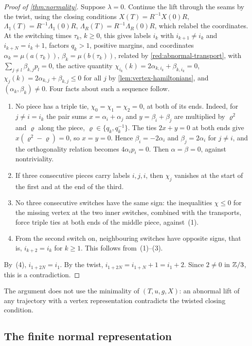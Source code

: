 \begin{proof}[Proof of \cref{thm:normality}]
Suppose $\lambda=0$. Continue the lift through the seams by the twist, using the closing conditions
$X(T)=R^{-1}X(0)R$, $\Lambda_1(T)=R^{-1}\Lambda_1(0)R$, $\Lambda_R(T)=R^{-1}\Lambda_R(0)R$, which
relabel the coordinates. At the switching times $\tau_k$, $k\ge0$, this gives labels $i_k$ with
$i_{k+1}\ne i_k$ and $i_{k+N}=i_k+1$, factors $q_k>1$, positive margins, and coordinates
$\alpha_k=\mu(a(\tau_k))$, $\beta_k=\mu(b(\tau_k))$, related by \cref{red:abnormal-transport}, with
$\sum_{j\ne l}\beta_{k,j}p_l=0$, the active quantity
$\chi_{i_k}(k)=2\alpha_{k,i_k}+\beta_{k,i_k}=0$, $\chi_j(k)=2\alpha_{k,j}+\beta_{k,j}\le0$ for all
$j$ by \cref{lem:vertex-hamiltonians}, and $(\alpha_k,\beta_k)\ne0$. Four facts about such a sequence follow.
\begin{enumerate}
\item No piece has a triple tie, $\chi_0=\chi_1=\chi_2=0$, at both of its ends. Indeed, for $j\ne i=i_k$ the pair sums
  $x=\alpha_i+\alpha_j$ and $y=\beta_i+\beta_j$ are multiplied by $\varrho^2$ and $\varrho$ along the
  piece, $\varrho\in\{q_k,q_k^{-1}\}$. The ties $2x+y=0$ at both ends give $x(\varrho^2-\varrho)=0$,
  so $x=y=0$. Hence $\beta_i=-2\alpha_i$ and $\beta_j=2\alpha_i$ for $j\ne i$, and the orthogonality
  relation becomes $4\alpha_ip_i=0$. Then $\alpha=\beta=0$, against nontriviality.
\item If three consecutive pieces carry labels $i,j,i$, then $\chi_j$ vanishes at the start of the
  first and at the end of the third.
\item No three consecutive switches have the same sign: the
  inequalities $\chi\le0$ for the missing vertex at the two inner switches, combined with the
  transports, force triple ties at both ends of the middle piece, against~(1).
\item From the second switch on, neighbouring switches have opposite signs, that is,
  $i_{k+2}=i_k$ for $k\ge1$. This follows from~(1)--(3).
\end{enumerate}
By~(4), $i_{1+2N}=i_1$. By the twist, $i_{1+2N}=i_{1+N}+1=i_1+2$. Since $2\ne0$ in $\mathbb{Z}/3$, this is
a contradiction.
\end{proof}

The argument does not use the minimality of $(T,u,g,X)$: an abnormal lift of any trajectory with a
vertex representation contradicts the twisted closing condition.

\subsection{The finite normal representation}\label{red:assembly}

